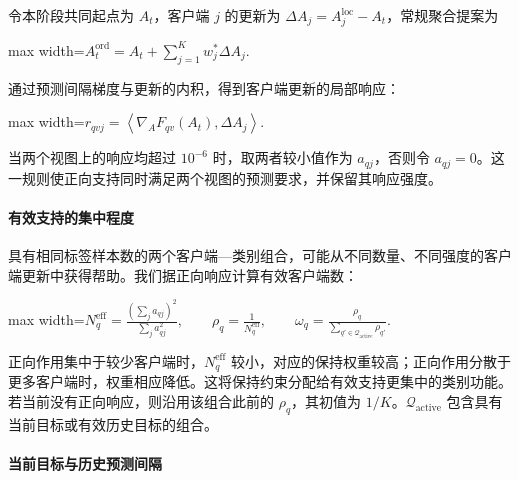 \documentclass[UTF8,a4paper,10pt,fontset=fandol]{ctexart}
\begin{document}
令本阶段共同起点为 $A_t$，客户端 $j$ 的更新为 $\Delta A_j=A_j^{\mathrm{loc}}-A_t$，常规聚合提案为


\begin{center}\begin{adjustbox}{max width=\linewidth}$\displaystyle A_t^{\mathrm{ord}}=A_t+\sum_{j=1}^{K}w_j^*\Delta A_j.$\end{adjustbox}\end{center}

通过预测间隔梯度与更新的内积，得到客户端更新的局部响应：


\begin{center}\begin{adjustbox}{max width=\linewidth}$\displaystyle r_{qvj}=\left\langle\nabla_A F_{qv}(A_t),\Delta A_j\right\rangle.$\end{adjustbox}\end{center}

当两个视图上的响应均超过 $10^{-6}$ 时，取两者较小值作为 $a_{qj}$，否则令 $a_{qj}=0$。这一规则使正向支持同时满足两个视图的预测要求，并保留其响应强度。


\paragraph{有效支持的集中程度}

具有相同标签样本数的两个客户端—类别组合，可能从不同数量、不同强度的客户端更新中获得帮助。我们据正向响应计算有效客户端数：


\begin{center}\begin{adjustbox}{max width=\linewidth}$\displaystyle N_q^{\mathrm{eff}}
=\frac{\left(\sum_j a_{qj}\right)^2}{\sum_j a_{qj}^2},
\qquad
\rho_q=\frac{1}{N_q^{\mathrm{eff}}},
\qquad
\omega_q=\frac{\rho_q}{\sum_{q'\in\mathcal Q_{\mathrm{active}}}\rho_{q'}}.$\end{adjustbox}\end{center}

正向作用集中于较少客户端时，$N_q^{\mathrm{eff}}$ 较小，对应的保持权重较高；正向作用分散于更多客户端时，权重相应降低。这将保持约束分配给有效支持更集中的类别功能。若当前没有正向响应，则沿用该组合此前的 $\rho_q$，其初值为 $1/K$。$\mathcal Q_{\mathrm{active}}$ 包含具有当前目标或有效历史目标的组合。


\paragraph{当前目标与历史预测间隔}
\end{document}
